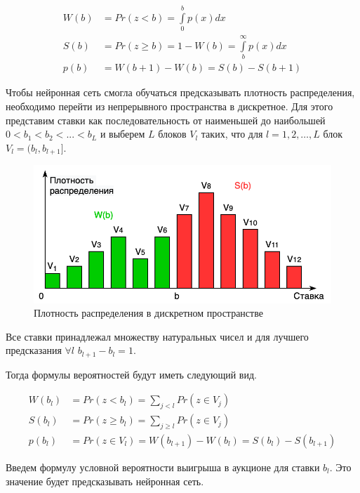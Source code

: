 \documentclass[times,specification,annotation]{itmo-student-thesis}
\begin{document}
\begin{equation}
    \begin{split}
        W(b) & = Pr(z < b) = \int\limits_{0}^b p(x) dx \\
        S(b) & = Pr(z \geq b) = 1 - W(b) = \int\limits_{b}^{\infty} p(x) dx \\
        p(b) & = W(b + 1) - W(b) = S(b) - S(b + 1)            
    \end{split}
\end{equation}

Чтобы нейронная сеть смогла обучаться предсказывать плотность распределения, 
необходимо перейти из непрерывного пространства в дискретное.
Для этого представим ставки как последовательность 
от наименьшей до наибольшей $0<b_1<b_2< ...< b_L$ и выберем $L$ блоков $V_l$ таких, 
что для $l=1, 2, …, L$ блок $V_l=(b_l,b_{l+1}]$.

\begin{figure}[h]
    \caption{Плотность распределения в дискретном пространстве}
    \centering
    \includegraphics{w_s_discret.png}
\end{figure}

Все ставки принадлежал множеству натуральных чисел и для лучшего предсказания $\forall l$  $b_{l+1}-b_l=1$.

Тогда формулы вероятностей будут иметь следующий вид.

\begin{equation}
    \begin{split}
        W(b_l) & = Pr(z < b_l) = \sum_{j<l} Pr(z \in V_j) \\
        S(b_l) & = Pr(z \geq b_l) = \sum_{j \geq l} Pr(z \in V_j) \\
        p(b_l) & = Pr(z \in V_l) =  W(b_{l + 1}) - W(b_l) = S(b_l) - S(b_{l + 1})
    \end{split}
\end{equation}

Введем формулу условной вероятности выигрыша в аукционе для ставки $b_l$. 
Это значение будет предсказывать нейронная сеть.
\end{document}
